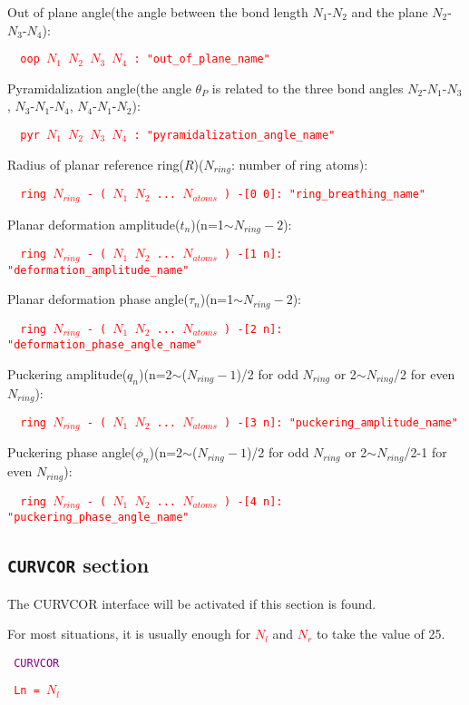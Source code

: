 Out of plane angle(the angle between the bond length $N_1$-$N_2$ and the plane $N_2$-$N_3$-$N_4$):

\texttt{
\textcolor{red}{
oop $N_1$ $N_2$ $N_3$ $N_4$ : "out\_of\_plane\_name"
}}


Pyramidalization angle(the angle $\theta_P$ is related to the three bond angles $N_2$-$N_1$-$N_3$, $N_3$-$N_1$-$N_4$, $N_4$-$N_1$-$N_2$):


\texttt{
\textcolor{red}{
pyr $N_1$ $N_2$ $N_3$ $N_4$ : "pyramidalization\_angle\_name"
}}


Radius of planar reference ring($R$)($N_{ring}$: number of ring atoms):


\texttt{
\textcolor{red}{
ring $N_{ring}$ - ( $N_1$ $N_2$ ... $N_{atoms}$ ) -[0 0]: "ring\_breathing\_name"
}}

Planar deformation amplitude($t_n$)(n=1$\sim$$N_{ring}-2$):

\texttt{
\textcolor{red}{
ring $N_{ring}$ - ( $N_1$ $N_2$ ... $N_{atoms}$ ) -[1 n]: "deformation\_amplitude\_name"
}}

Planar deformation phase angle($\tau_n$)(n=1$\sim$$N_{ring}-2$):

\texttt{
\textcolor{red}{
ring $N_{ring}$ - ( $N_1$ $N_2$ ... $N_{atoms}$ ) -[2 n]: "deformation\_phase\_angle\_name"
}}


Puckering amplitude($q_n$)(n=2$\sim$($N_{ring}-1$)/2 for odd $N_{ring}$ or 2$\sim$$N_{ring}$/2 for even $N_{ring}$):

\texttt{
\textcolor{red}{
ring $N_{ring}$ - ( $N_1$ $N_2$ ... $N_{atoms}$ ) -[3 n]: "puckering\_amplitude\_name"
}}


Puckering phase angle($\phi_n$)(n=2$\sim$($N_{ring}-1$)/2 for odd $N_{ring}$ or 2$\sim$$N_{ring}$/2-1 for even $N_{ring}$):


\texttt{
\textcolor{red}{
ring $N_{ring}$ - ( $N_1$ $N_2$ ... $N_{atoms}$ ) -[4 n]: "puckering\_phase\_angle\_name"
}}


\subsection{\texttt{CURVCOR} section }
The CURVCOR interface will be activated if this section is found.

For most situations, it is usually enough for 
\texttt{\textcolor{red}{$N_l$}} and \texttt{\textcolor{red}{$N_r$}} to take the value of 25.


\texttt{
\textcolor{Purple}{CURVCOR}}

\texttt{
\textcolor{red}{Ln = $N_l$}}


